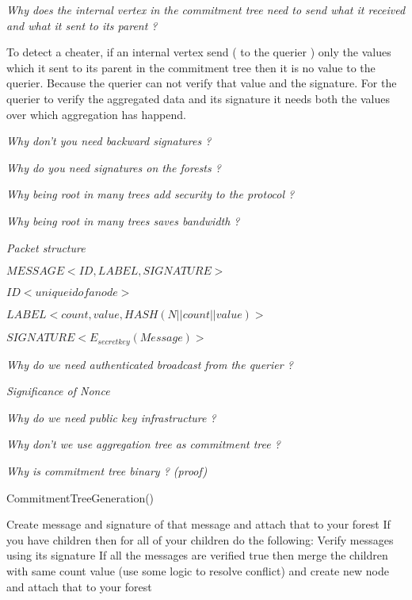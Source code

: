 \textit{Why does the internal vertex in the commitment tree need to send what it received and what it sent to its parent ?}
	
	To detect a cheater, if an internal vertex send ( to the querier ) only the values which it sent to its parent in the commitment tree then it is no value to the querier. Because the querier can not verify that value and the signature. For the querier to verify the aggregated data and its signature it needs both the values over which aggregation has happend. 

\textit{Why don't you need backward signatures ?}

\textit{Why do you need signatures on the forests ?}

\textit{Why being root in many trees add security to the protocol ?}

\textit{Why being root in many trees saves bandwidth ?}

\textit{Packet structure}

$MESSAGE <ID, LABEL, SIGNATURE>$

$ID <unique id of a node>$

$LABEL <count, value, HASH(N||count||value)>$

$SIGNATURE <E_{secretkey}(Message)>$

\textit{Why do we need authenticated broadcast from the querier ?}

\textit{Significance of Nonce}

\textit{Why do we need public key infrastructure ?}

\textit{Why don't we use aggregation tree as commitment tree ?}

\textit{Why is commitment tree binary ? (proof)}

\begin{algorithm}[H]
\caption {CommitmentTreeGeneration()}\label{number3}
	\begin {algorithmic}[1]
			\STATE Create message and signature of that message and attach that to your forest
			\STATE If you have children then for all of your children do the following:
			\STATE Verify messages using its signature 
			\STATE If all the messages are verified true then merge the children with same count value (use some logic to resolve conflict) and create new node and attach that to your forest
		\ENDFOR
	\end{algorithmic}
\end{algorithm}